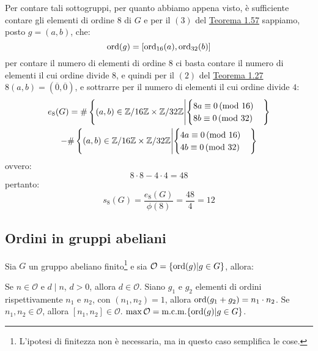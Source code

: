 \documentclass[11pt]{scrartcl}
\begin{document}
\begin{soln}
Per contare tali sottogruppi, per quanto abbiamo appena visto, è sufficiente contare gli elementi di ordine $8$ di $G$ e per il $(3)$ del \hyperref[g:ProdottoDiretto]{Teorema 1.57} sappiamo, posto $g=(a,b)$, che:
	\[ \operatorname{ord}(g) = [\operatorname{ord}_{16}(a), \operatorname{ord}_{32}(b)]
	\]
per contare il numero di elementi di ordine $8$ ci basta contare il numero di elementi il cui ordine divide $8$, e quindi per il $(2)$ del \hyperref[thm:g_due]{Teorema 1.27} $8(a,b) = (\overline 0, \overline 0)$, e sottrarre per il numero di elementi il cui ordine divide $4$:
	\begin{multline*} 
	e_8(G) = \#\left\{(a,b) \in \mathbb Z/16\mathbb Z \times \mathbb Z/32\mathbb Z \middle| \begin{cases}
				8a \equiv 0\,(\text{mod 16}) \\
				8b \equiv 0\,(\text{mod 32})
				\end{cases}\right\} \\-
				\#\left\{(a,b) \in \mathbb Z/16\mathbb Z \times \mathbb Z/32\mathbb Z \middle| \begin{cases}
				4a \equiv 0\,(\text{mod 16}) \\
				4b \equiv 0\,(\text{mod 32})
				\end{cases}\right\}
	\end{multline*}
ovvero:
	\[ 8 \cdot 8 - 4 \cdot 4 = 48
	\]
pertanto:
	\[ s_8(G) = \frac{e_8(G)}{\phi(8)} = \frac{48}{4} = 12
	\]
\end{soln}

\subsection{Ordini in gruppi abeliani}
\begin{lemma}
\label{A.20}
Sia $G$ un gruppo abeliano finito\footnote{L'ipotesi di finitezza non è necessaria, ma in questo caso semplifica le cose.} e sia $\mathcal{O} = \left\{\operatorname{ord}(g)| g \in G\right\}$, allora:
	\begin{enumerate}[(1)]
	\ii Se $n \in \mathcal O$ e $d \mid n$, $d>0$, allora $d \in \mathcal O$.
	\ii Siano $g_1$ e $g_2$ elementi di ordini rispettivamente $n_1$ e $n_2$, con $(n_1,n_2)=1$, allora $\operatorname{ord}(g_1+g_2) = n_1\cdot n_2$.
	\ii Se $n_1, n_2 \in \mathcal O$, allora $[n_1,n_2] \in \mathcal O$.
	\ii $\max \mathcal O = \text{m.c.m.}\{\operatorname{ord}(g) | g \in G\}$.
	\end{enumerate}
\end{lemma}
\end{document}
